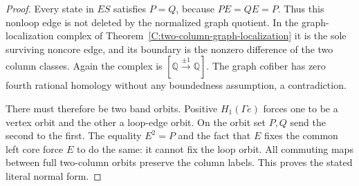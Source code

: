 \begin{proof}
Every state in $ES$ satisfies $P=Q$, because
$PE=QE=P$.  Thus this nonloop edge is not deleted by
the normalized graph quotient.  In the graph-localization
complex of Theorem~\ref{C:two-column-graph-localization}
it is the sole surviving noncore edge, and its boundary
is the nonzero difference of the two column classes.
Again the complex is
$[\mathbb Q\xrightarrow{\pm1}\mathbb Q]$.
The graph cofiber has zero fourth rational homology
without any boundedness assumption, a contradiction.

There must therefore be two band orbits.  Positive
$H_1(\Gamma e)$ forces one to be a vertex orbit and the
other a loop-edge orbit.  On the orbit set $P,Q$ send
the second to the first.  The equality $E^2=P$ and
the fact that $E$ fixes the common left core force
$E$ to do the same: it cannot fix the loop orbit.
All commuting maps between full two-column orbits
preserve the column labels.  This proves the stated
literal normal form.
\end{proof}


